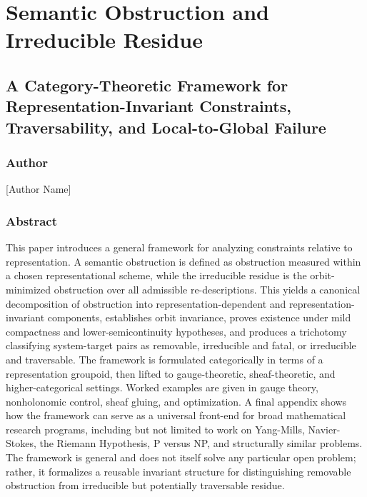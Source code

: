 \documentclass[
]{article}
\author{}
\date{}
\begin{document}
\section{Semantic Obstruction and Irreducible
Residue}\label{semantic-obstruction-and-irreducible-residue}

\subsection{A Category-Theoretic Framework for Representation-Invariant
Constraints, Traversability, and Local-to-Global
Failure}\label{a-category-theoretic-framework-for-representation-invariant-constraints-traversability-and-local-to-global-failure}

\subsubsection{Author}\label{author}

{[}Author Name{]}

\subsubsection{Abstract}\label{abstract}

This paper introduces a general framework for analyzing constraints
relative to representation. A semantic obstruction is defined as
obstruction measured within a chosen representational scheme, while the
irreducible residue is the orbit-minimized obstruction over all
admissible re-descriptions. This yields a canonical decomposition of
obstruction into representation-dependent and representation-invariant
components, establishes orbit invariance, proves existence under mild
compactness and lower-semicontinuity hypotheses, and produces a
trichotomy classifying system-target pairs as removable, irreducible and
fatal, or irreducible and traversable. The framework is formulated
categorically in terms of a representation groupoid, then lifted to
gauge-theoretic, sheaf-theoretic, and higher-categorical settings.
Worked examples are given in gauge theory, nonholonomic control, sheaf
gluing, and optimization. A final appendix shows how the framework can
serve as a universal front-end for broad mathematical research programs,
including but not limited to work on Yang-Mills, Navier-Stokes, the
Riemann Hypothesis, P versus NP, and structurally similar problems. The
framework is general and does not itself solve any particular open
problem; rather, it formalizes a reusable invariant structure for
distinguishing removable obstruction from irreducible but potentially
traversable residue.
\end{document}
